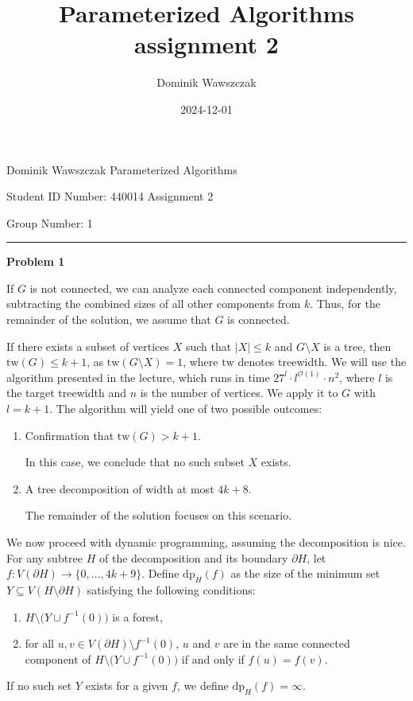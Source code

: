 \documentclass[12pt]{article}
\title{Parameterized Algorithms assignment 2}
\author{Dominik Wawszczak}
\date{2024-12-01}
\begin{document}
	\setlength{\parindent}{0 cm}
	
	Dominik Wawszczak \hfill Parameterized Algorithms
	
	Student ID Number: 440014 \hfill Assignment 2
	
	Group Number: 1
	
	\bigskip
	\hrule
	\bigskip
	
	\textbf{Problem 1}
	
	\medskip
	
	If \(G\) is not connected, we can analyze each connected component
	independently, subtracting the combined sizes of all other components from
	\(k\). Thus, for the remainder of the solution, we assume that \(G\) is
	connected.
	
	\medskip
	
	
	If there exists a subset of vertices \(X\) such that \(|X| \leqslant k\) and
	\(G \setminus X\) is a tree, then \(\text{tw}(G) \leqslant k + 1\), as
	\(\text{tw}(G \setminus X) = 1\), where \(\text{tw}\) denotes treewidth. We
	will use the algorithm presented in the lecture, which runs in time \(27^{l}
	\cdot l^{\mathcal{O}(1)} \cdot n^{2}\), where \(l\) is the target treewidth
	and \(n\) is the number of vertices. We apply it to \(G\) with \(l = k +
	1\). The algorithm will yield one of two possible outcomes:
	\begin{enumerate}
		\item Confirmation that \(\text{tw}(G) > k + 1\).
		      
		      In this case, we conclude that no such subset \(X\) exists.
		
		\item A tree decomposition of width at most \(4k + 8\).
		      
		      The remainder of the solution focuses on this scenario.
	\end{enumerate}
	
	\medskip
	
	We now proceed with dynamic programming, assuming the decomposition is nice.
	For any subtree \(H\) of the decomposition and its boundary \(\partial H\),
	let \(f : V(\partial H) \to \{0, \ldots, 4k + 9\}\). Define
	\(\text{dp}_{H}(f)\) as the size of the minimum set \(Y \subseteq
	V(H \setminus \partial H)\) satisfying the following conditions:
	\begin{enumerate}
		\item \(H \setminus \big( Y \cup f^{-1}(0) \big)\) is a forest,
		\item for all \(u, v \in V(\partial H) \setminus f^{-1}(0)\), \(u\) and
		\(v\) are in the same connected component of \(H \setminus \big( Y \cup
		f^{-1}(0) \big)\) if and only if \(f(u) = f(v)\).
	\end{enumerate}
	If no such set \(Y\) exists for a given \(f\), we define \(\text{dp}_{H}(f)
	= \infty\).
	
\end{document}
